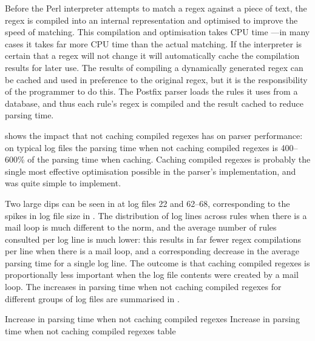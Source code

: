 \label{Caching compiled regexes}

Before the Perl interpreter attempts to match a regex against a piece of
text, the regex is compiled into an internal representation and
optimised to improve the speed of matching.  This compilation and
optimisation takes CPU time ---in many cases it takes far more CPU time
than the actual matching.  If the interpreter is certain that a regex
will not change it will automatically cache the compilation results for
later use.   The results of compiling a dynamically generated regex can
be cached and used in preference to the original regex, but it is the
responsibility of the programmer to do this.  The Postfix parser loads the
rules it uses from a database, and thus each rule's regex is compiled
and the result cached to reduce parsing time.

shows the impact that not caching compiled regexes has on parser
performance: on typical log files the parsing time when not caching
compiled regexes is 400--600\% of the parsing time when caching.
Caching compiled regexes is probably the single most effective
optimisation possible in the parser's implementation, and was quite simple
to implement.


Two large dips can be seen in  at log files 22 and 62--68, corresponding
to the spikes in log file size in .  The distribution of log lines across rules
when there is a mail loop is much different to the norm, and the average
number of rules consulted per log line is much lower: this results in far
fewer regex compilations per line when there is a mail loop, and a
corresponding decrease in the average parsing time for a single log line.
The outcome is that caching compiled regexes is proportionally less
important when the log file contents were created by a mail loop.  The
increases in parsing time when not caching compiled regexes for different
groups of log files are summarised in .

 {Increase in
parsing time when not caching compiled regexes} {Increase in parsing time
when not caching compiled regexes table}


